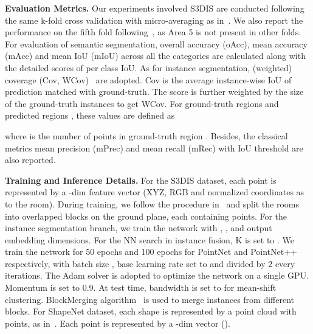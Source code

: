 \documentclass[10pt,twocolumn,letterpaper]{article}
\newcommand{\myparagraph}[1]{{\vspace{0.5em} \noindent \bf #1}}
\begin{document}
\myparagraph{Evaluation Metrics.}
Our experiments involved S3DIS are conducted following the same k-fold cross validation with micro-averaging as in~\cite{Qi_2017_CVPR}. 
We also report the performance on the fifth fold following~\cite{tchapmi2017segcloud}, as Area 5 is not present in other folds. 
For evaluation of semantic segmentation, overall accuracy (oAcc), mean accuracy (mAcc) and mean IoU (mIoU) across all the categories are calculated along with the detailed scores of per class IoU.
As for instance segmentation, (weighted) coverage (Cov, WCov)~\cite{ren17recattend, SGN17,zhuo2017indoor} are adopted.
Cov is the average instance-wise IoU of prediction matched with ground-truth. 
The score is further weighted by the size of the ground-truth instances to get WCov.
For ground-truth regions  and predicted regions , these values are defined as 





where  is the number of points in ground-truth region .
Besides, the classical metrics mean precision (mPrec) and mean recall (mRec) with IoU threshold  are also reported. 

\myparagraph{Training and Inference Details.}
For the S3DIS dataset, each point is represented by a -dim feature vector (XYZ, RGB and normalized coordinates as to the room).
During training, we follow the procedure in~\cite{Qi_2017_CVPR} and split the rooms into  overlapped blocks on the ground plane, each containing  points.
For the instance segmentation branch, we train the network with , , and  output embedding dimensions. 
For the NN search in instance fusion, K is set to .
We train the network for 50 epochs and 100 epochs for PointNet and PointNet++ respectively, with batch size , base learning rate set to  and divided by 2 every  iterations. 
The Adam solver is adopted to optimize the network on a single GPU.
Momentum is set to 0.9.
At test time, bandwidth is set to  for mean-shift clustering.
BlockMerging algorithm~\cite{sgpn} is used to merge instances from different blocks.
For ShapeNet dataset, each shape is represented by a point cloud with  points, as in~\cite{Qi_2017_CVPR}. Each point is represented by a -dim vector ().
\end{document}
